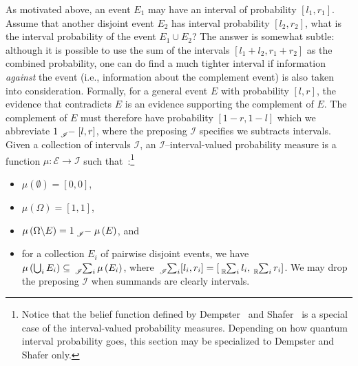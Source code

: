 \documentclass{article}
\theoremstyle{remark}
\newcommand{\events}{\ensuremath{\mathcal{E}}}
\newcommand{\pmeas}{\ensuremath{\mu}}
\newcommand{\necess}{{\mbox{\wesa{certain}}}}
\begin{document}
As motivated above, an event $E_1$ may have an interval of probability
$[l_1,r_1]$. Assume that another disjoint event $E_2$ has interval
probability $[l_2,r_2]$, what is the interval probability of the event
$E_1 \cup E_2$? The answer is somewhat subtle: although it is possible
to use the sum of the intervals $[l_1+l_2,r_1+r_2]$ as the combined
probability, one can do find a much tighter interval if information
\emph{against} the event (i.e., information about the complement
event) is also taken into consideration. Formally, for a general event
$E$ with probability $[l,r]$, the evidence that
contradicts $E$ is an evidence supporting the complement of $E$. The
complement of $E$ must therefore have probability
$\left[1-r,1-l\right]$ which we abbreviate $1\tensor*[_{\mathscr{I}}]{-}{}\left[l,r\right]$,
where the preposing $\mathscr{I}$ specifies we subtracts intervals. Given
a collection of intervals $\mathscr{I}$, an
$\mathscr{I}$--interval-valued probability measure is a function
$\pmeas : \events \rightarrow \mathscr{I}$ such
that~\cite{JamisonLodwick2004}:\footnote{Notice that the belief function defined by Dempster~\cite{Dempster1967}
and Shafer~\cite{Shafer1976} is a special case of the interval-valued
probability measures. Depending on how quantum interval probability goes, this
section may be specialized to Dempster and Shafer only.}
\begin{itemize}
\item $\pmeas(\emptyset)=[0,0]$, 
\item $\pmeas(\Omega)=[1,1]$, 
\item $\pmeas\left(\Omega\backslash E\right)=1\tensor*[_{\mathscr{I}}]{-}{}\pmeas\left(E\right)$,
  and 
\item for a collection $E_{i}$ of pairwise disjoint events, we have $\pmeas\left(\bigcup_{i}E_{i}\right)\subseteq\tensor*[_{\mathscr{I}}]{\sum}{_{i}}\pmeas\left(E_{i}\right)$,
where $\tensor*[_{\mathscr{I}}]{\sum}{_{i}}[l_{i},r_{i}]=\left[\tensor*[_{\mathbb{R}}]{\sum}{_{i}}l_{i},\tensor*[_{\mathbb{R}}]{\sum}{_{i}}r_{i}\right]$.
We may drop the preposing $\mathscr{I}$ when summands are clearly intervals. 
\end{itemize}

\end{document}
